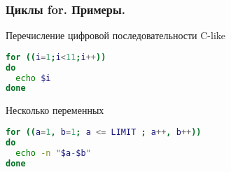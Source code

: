 \begin{frame}[fragile]
\frametitle{ Циклы for. Примеры.}
  \begin{block}{Перечисление цифровой последовательности C-like }
\begin{lstlisting}[language=sh,frame=single]
for ((i=1;i<11;i++))
do 
  echo $i
done  
\end{lstlisting}
  \end{block}

  \begin{block}{Несколько переменных}
    \begin{lstlisting}[language=sh,frame=single]
for ((a=1, b=1; a <= LIMIT ; a++, b++))
do
  echo -n "$a-$b"
done
    \end{lstlisting}
  \end{block}
\end{frame}
